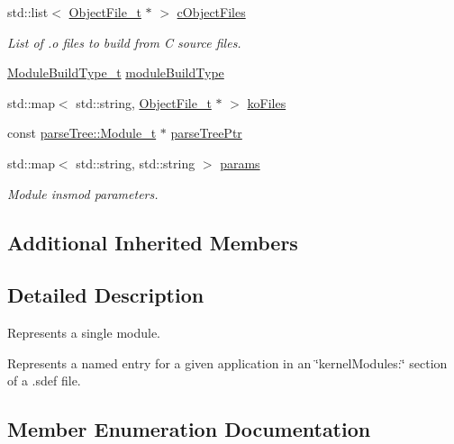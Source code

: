 \begin{DoxyCompactItemize}
std\+::list$<$ \hyperlink{struct_object_file__t}{Object\+File\+\_\+t} $\ast$ $>$ \hyperlink{struct_module__t_a548a3f3c5215fa22c006d87dc0d11231}{c\+Object\+Files}
\begin{DoxyCompactList}\small\item\em List of .o files to build from C source files. \end{DoxyCompactList}\item 
\hyperlink{struct_module__t_a889284dddd5ba67aa7bcf51040e49c7d}{Module\+Build\+Type\+\_\+t} \hyperlink{struct_module__t_a95164d9c875ec5ccb299b8efba2fee2d}{module\+Build\+Type}
\item 
std\+::map$<$ std\+::string, \hyperlink{struct_object_file__t}{Object\+File\+\_\+t} $\ast$ $>$ \hyperlink{struct_module__t_a58c707fff7b462ec48d6489abb838625}{ko\+Files}
\item 
const \hyperlink{structparse_tree_1_1_module__t}{parse\+Tree\+::\+Module\+\_\+t} $\ast$ \hyperlink{struct_module__t_af4fa6eed6c58b97550fb9c86260122b0}{parse\+Tree\+Ptr}
\item 
std\+::map$<$ std\+::string, std\+::string $>$ \hyperlink{struct_module__t_a59452388827cc8e3ea6fd8742248a2e2}{params}
\begin{DoxyCompactList}\small\item\em Module insmod parameters. \end{DoxyCompactList}\end{DoxyCompactItemize}
\subsection*{Additional Inherited Members}


\subsection{Detailed Description}
Represents a single module.

Represents a named entry for a given application in an \char`\"{}kernel\+Modules\+:\char`\"{} section of a .sdef file. 

\subsection{Member Enumeration Documentation}
